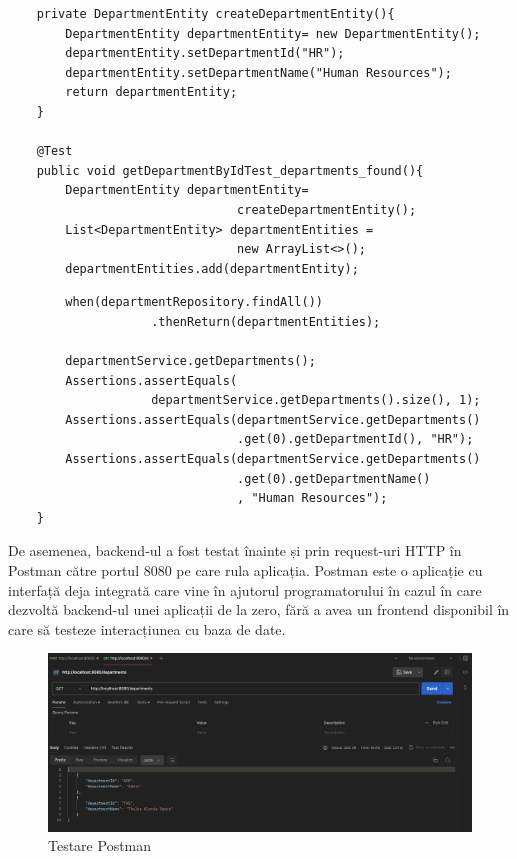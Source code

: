 \begin{center}
\begin{minipage}{0.9\textwidth}
\captionsetup{type=listing}
   \begin{lstlisting}
    private DepartmentEntity createDepartmentEntity(){
        DepartmentEntity departmentEntity= new DepartmentEntity();
        departmentEntity.setDepartmentId("HR");
        departmentEntity.setDepartmentName("Human Resources");
        return departmentEntity;
    }
    
    @Test
    public void getDepartmentByIdTest_departments_found(){
        DepartmentEntity departmentEntity= 
                                createDepartmentEntity();
        List<DepartmentEntity> departmentEntities = 
                                new ArrayList<>();
        departmentEntities.add(departmentEntity);

            \end{lstlisting} 
\end{minipage}
\end{center}
        

\begin{center}
\begin{minipage}{0.9\textwidth}
\captionsetup{type=listing}
   \begin{lstlisting}
        when(departmentRepository.findAll())
                    .thenReturn(departmentEntities);
   
        departmentService.getDepartments();
        Assertions.assertEquals(
                    departmentService.getDepartments().size(), 1);
        Assertions.assertEquals(departmentService.getDepartments()
                                .get(0).getDepartmentId(), "HR");
        Assertions.assertEquals(departmentService.getDepartments()
                                .get(0).getDepartmentName()
                                , "Human Resources");
    }
    \end{lstlisting} 
\end{minipage}
\end{center}

De asemenea, backend-ul a fost testat înainte și prin request-uri HTTP în Postman către portul 8080 pe care rula aplicația. Postman este o aplicație cu interfață deja integrată care vine în ajutorul programatorului în cazul în care dezvoltă backend-ul unei aplicații de la zero, fără a avea un frontend disponibil în care să testeze interacțiunea cu baza de date.

\begin{figure}[!htb]
    \centering
    \includegraphics[width=0.9\linewidth]{images/postman.png}
    \caption{Testare Postman}
    \label{fig:postman}
\end{figure}
